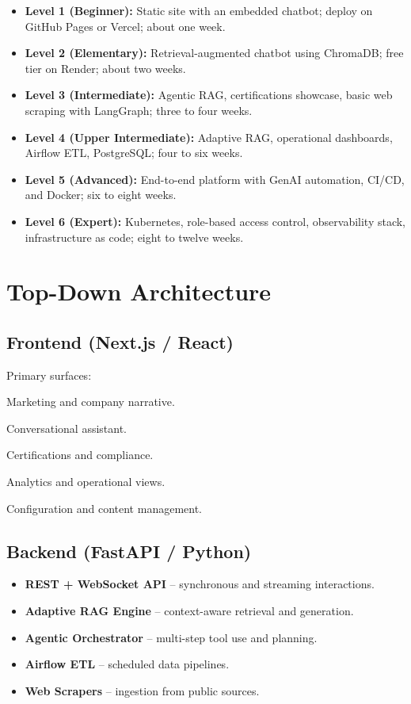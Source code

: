 \documentclass{article}
\begin{document}
\begin{itemize}[leftmargin=*]
  \item \textbf{Level 1 (Beginner):} Static site with an embedded chatbot; deploy on GitHub Pages or Vercel; about one week.
  \item \textbf{Level 2 (Elementary):} Retrieval-augmented chatbot using ChromaDB; free tier on Render; about two weeks.
  \item \textbf{Level 3 (Intermediate):} Agentic RAG, certifications showcase, basic web scraping with LangGraph; three to four weeks.
  \item \textbf{Level 4 (Upper Intermediate):} Adaptive RAG, operational dashboards, Airflow ETL, PostgreSQL; four to six weeks.
  \item \textbf{Level 5 (Advanced):} End-to-end platform with GenAI automation, CI/CD, and Docker; six to eight weeks.
  \item \textbf{Level 6 (Expert):} Kubernetes, role-based access control, observability stack, infrastructure as code; eight to twelve weeks.
\end{itemize}

\section{Top-Down Architecture}

\subsection{Frontend (Next.js / React)}

Primary surfaces:

\begin{description}[style=nextline]
  \item[Landing] Marketing and company narrative.
  \item[Chat] Conversational assistant.
  \item[Certs] Certifications and compliance.
  \item[Dash] Analytics and operational views.
  \item[Admin] Configuration and content management.
\end{description}

\subsection{Backend (FastAPI / Python)}

\begin{itemize}[leftmargin=*]
  \item \textbf{REST + WebSocket API} -- synchronous and streaming interactions.
  \item \textbf{Adaptive RAG Engine} -- context-aware retrieval and generation.
  \item \textbf{Agentic Orchestrator} -- multi-step tool use and planning.
  \item \textbf{Airflow ETL} -- scheduled data pipelines.
  \item \textbf{Web Scrapers} -- ingestion from public sources.
\end{itemize}
\end{document}
